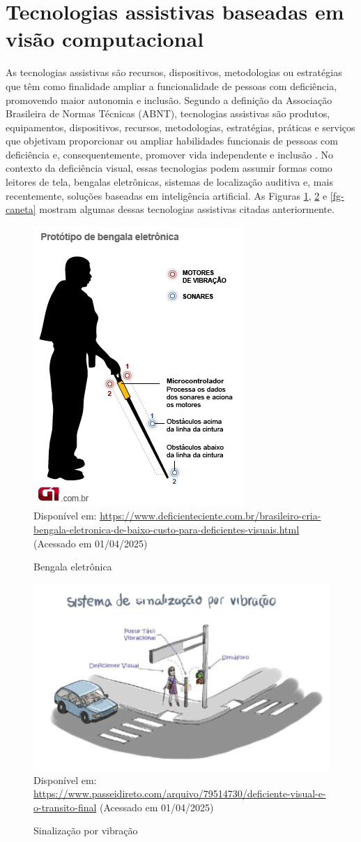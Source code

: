 \section{\textbf{Tecnologias assistivas baseadas em visão computacional}}
As tecnologias assistivas são recursos, dispositivos, metodologias ou estratégias que têm como finalidade ampliar a funcionalidade de pessoas com deficiência, promovendo maior autonomia e inclusão. Segundo a definição da Associação Brasileira de Normas Técnicas (ABNT), tecnologias assistivas são produtos, equipamentos, dispositivos, recursos, metodologias, estratégias, práticas e serviços que objetivam proporcionar ou ampliar habilidades funcionais de pessoas com deficiência e, consequentemente, promover vida independente e inclusão \cite{ABNT2004}. No contexto da deficiência visual, essas tecnologias podem assumir formas como leitores de tela, bengalas eletrônicas, sistemas de localização auditiva e, mais recentemente, soluções baseadas em inteligência artificial. As Figuras \ref{fg-bengala}, \ref{fg-sinal} e \ref{fg-caneta} mostram algumas dessas tecnologias assistivas citadas anteriormente.
\begin{figure}[htbp]
  \centering
  \caption{Bengala eletrônica}
  \includegraphics[width=0.4 \textwidth]{Figuras/bengala2.jpg}
  \\
  Disponível em: \url{https://www.deficienteciente.com.br/brasileiro-cria-bengala-eletronica-de-baixo-custo-para-deficientes-visuais.html} (Acessado em 01/04/2025)
  \label{fg-bengala}
\end{figure}

\begin{figure}[htbp]
  \centering
  \caption{Sinalização por vibração}
  \includegraphics[width=0.6 \textwidth]{Figuras/sinal-vibra.png}
  \\
  Disponível em: \url{https://www.passeidireto.com/arquivo/79514730/deficiente-visual-e-o-transito-final} (Acessado em 01/04/2025)
  \label{fg-sinal}
\end{figure}

